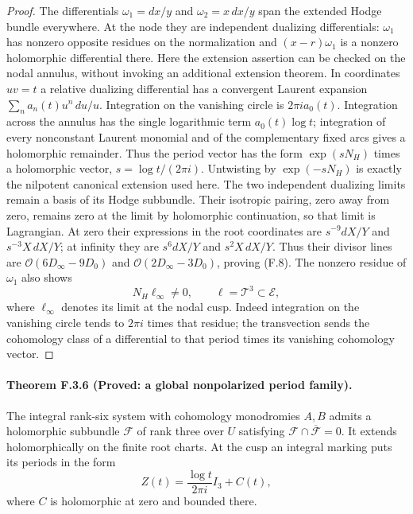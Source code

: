 \begin{proof}
The differentials $\omega_1=dx/y$ and $\omega_2=x\,dx/y$ span
the extended Hodge bundle everywhere.  At the node they are
independent dualizing differentials: $\omega_1$ has nonzero
opposite residues on the normalization and
$(x-r)\omega_1$ is a nonzero holomorphic differential there.
Here the extension assertion can be checked on the nodal
annulus, without invoking an additional extension theorem.
In coordinates $uv=t$ a relative dualizing differential has
a convergent Laurent expansion
$\sum_n a_n(t)u^n\,du/u$.  Integration on the vanishing circle
is $2\pi i a_0(t)$.  Integration across the annulus has the
single logarithmic term $a_0(t)\log t$; integration of every
nonconstant Laurent monomial and of the complementary fixed
arcs gives a holomorphic remainder.  Thus the period vector
has the form $\exp(sN_H)$ times a holomorphic vector,
$s=\log t/(2\pi i)$.  Untwisting by $\exp(-sN_H)$ is exactly
the nilpotent canonical extension used here.  The two independent
dualizing limits remain a basis of its Hodge subbundle.
Their isotropic pairing, zero away from zero, remains zero
at the limit by holomorphic continuation, so that limit is
Lagrangian.
At zero their expressions in the root coordinates are
$s^{-9}dX/Y$ and $s^{-3}X\,dX/Y$; at infinity they are
$s^6dX/Y$ and $s^2X\,dX/Y$.
Thus their divisor lines are
$\mathcal O(6D_\infty-9D_0)$ and
$\mathcal O(2D_\infty-3D_0)$, proving (F.8).
The nonzero residue of $\omega_1$ also shows
\[
 N_H\ell_\infty\ne0,
 \qquad \ell=\mathcal T^3\subset\mathcal E,
 \tag{F.12}
\]
where $\ell_\infty$ denotes its limit at the nodal cusp.
Indeed integration on the vanishing circle tends to
$2\pi i$ times that residue; the transvection sends the cohomology
class of a differential to that period times its vanishing
cohomology vector.
\end{proof}

\paragraph{Theorem F.3.6 (Proved: a global nonpolarized period family).}
The integral rank-six system with cohomology monodromies $A,B$
admits a holomorphic subbundle $\mathcal F$ of rank three over
$U$ satisfying $\mathcal F\cap\overline{\mathcal F}=0$.
It extends holomorphically on the finite root charts.  At the
cusp an integral marking puts its periods in the form
\[
 Z(t)=\frac{\log t}{2\pi i}I_3+C(t),
 \tag{F.13}
\]
where $C$ is holomorphic at zero and bounded there.


